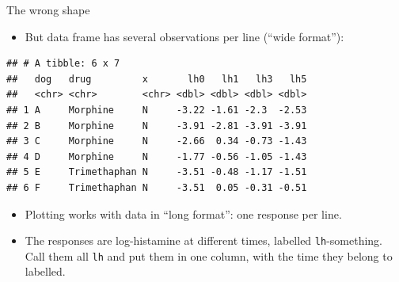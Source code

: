 \documentclass[
  ignorenonframetext,
]{beamer}
\newenvironment{Shaded}{\begin{snugshade}}{\end{snugshade}}
\newcommand{\DecValTok}[1]{\textcolor[rgb]{0.00,0.00,0.81}{#1}}
\newcommand{\KeywordTok}[1]{\textcolor[rgb]{0.13,0.29,0.53}{\textbf{#1}}}
\newcommand{\NormalTok}[1]{#1}
\newcommand{\OperatorTok}[1]{\textcolor[rgb]{0.81,0.36,0.00}{\textbf{#1}}}
\newcommand{\StringTok}[1]{\textcolor[rgb]{0.31,0.60,0.02}{#1}}
\providecommand{\tightlist}{%
  \setlength{\itemsep}{0pt}\setlength{\parskip}{0pt}}
\begin{document}
\begin{frame}[fragile]{The wrong shape}
\protect\hypertarget{the-wrong-shape}{}

\begin{itemize}
\tightlist
\item
  But data frame has several observations per line (``wide format''):
\end{itemize}

\scriptsize

\begin{Shaded}
\end{Shaded}

\begin{verbatim}
## # A tibble: 6 x 7
##   dog   drug         x       lh0   lh1   lh3   lh5
##   <chr> <chr>        <chr> <dbl> <dbl> <dbl> <dbl>
## 1 A     Morphine     N     -3.22 -1.61 -2.3  -2.53
## 2 B     Morphine     N     -3.91 -2.81 -3.91 -3.91
## 3 C     Morphine     N     -2.66  0.34 -0.73 -1.43
## 4 D     Morphine     N     -1.77 -0.56 -1.05 -1.43
## 5 E     Trimethaphan N     -3.51 -0.48 -1.17 -1.51
## 6 F     Trimethaphan N     -3.51  0.05 -0.31 -0.51
\end{verbatim}

\normalsize

\begin{itemize}
\item
  Plotting works with data in ``long format'': one response per line.
\item
  The responses are log-histamine at different times, labelled
  \texttt{lh}-something. Call them all \texttt{lh} and put them in one
  column, with the time they belong to labelled.
\end{itemize}

\end{frame}
\end{document}

